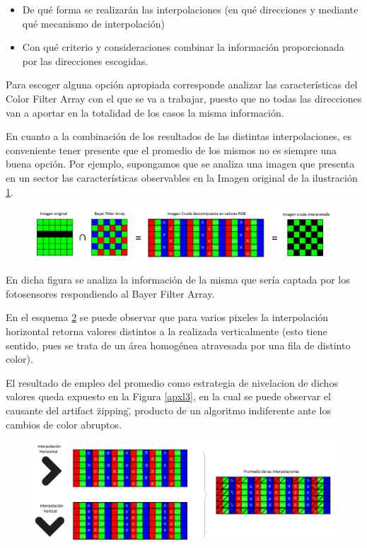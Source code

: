 \documentclass[a4paper]{article}
\begin{document}
\begin{itemize}
    \item De qué forma se realizarán las interpolaciones (en qué direcciones y mediante qué mecanismo de interpolación)
    \item Con qué criterio y consideraciones combinar la información proporcionada por las direcciones escogidas.
\end{itemize}

Para escoger alguna opción apropiada corresponde analizar las características del Color Filter Array con el que se va a trabajar, puesto que no todas las direcciones van a aportar en la totalidad de los casos la misma información.

En cuanto a la combinación de los resultados de las distintas interpolaciones, es conveniente tener presente que el promedio de los mismos no es siempre una buena opción. Por ejemplo, supongamos que se analiza una imagen que presenta en un sector las características observables en la Imagen original de la ilustración \ref{apxl1}.


\begin{figure}[h!]
	\caption{}
	\begin{center}
	\includegraphics[scale=0.36]{imagenes/apxl1}
	\label{apxl1}
  \end{center}
\end{figure}

En dicha figura se analiza la información de la misma que sería captada por los fotosensores respondiendo al Bayer Filter Array. 

En el esquema \ref{apxl2} se puede observar que para varios pixeles la interpolación horizontal retorna valores distintos a la realizada verticalmente (esto tiene sentido, pues se trata de un área homogénea atravesada por una fila de distinto color).

El resultado de empleo del promedio como estrategia de nivelacion de dichos valores queda expuesto en la Figura \ref{apxl3}, en la cual se puede observar el causante del artifact \"zipping\", producto de un algoritmo indiferente ante los cambios de color abruptos.\\

\begin{figure}[h!]
	\caption{}
	\begin{center}
\includegraphics[scale=0.26]{imagenes/apxl2}
	\label{apxl2}
  \end{center}
\end{figure}
\end{document}
